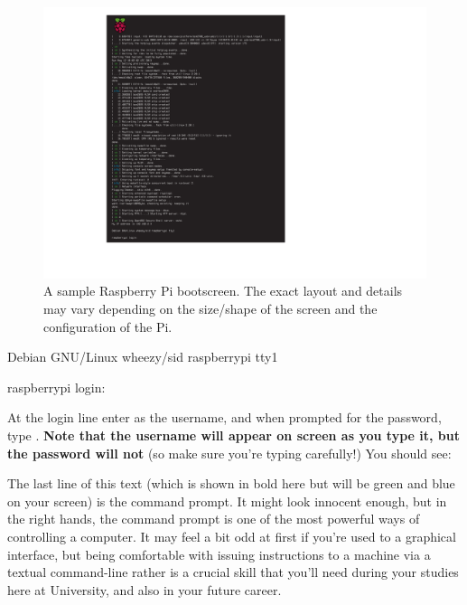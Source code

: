 \begin{figure}
\centerline{\includegraphics[width=15cm]{images/bootscreen}}
\caption{A sample Raspberry Pi bootscreen. The exact layout and details may vary depending on the size/shape of the screen and the configuration of the Pi.}\label{figure:piboot}
\end{figure}

\begin{ttoutenv}
Debian GNU/Linux wheezy/sid raspberrypi tty1

raspberrypi login:
\end{ttoutenv}

At the login line enter  as the username, and when prompted for the password, type . \textbf{Note that the username will appear on screen as you type it, but the password will not} (so make sure you're typing carefully!) You should see:



%

The last line of this text (which is shown in bold here but will be green and blue on your screen) is the command prompt. It might look innocent enough, but in the right hands, the command prompt is one of the most powerful ways of controlling a computer. It may feel a bit odd at first if you're used to a graphical interface, but being comfortable with issuing instructions to a machine via a textual command-line rather is a crucial skill that you'll need during your studies here at University, and also in your future career.

